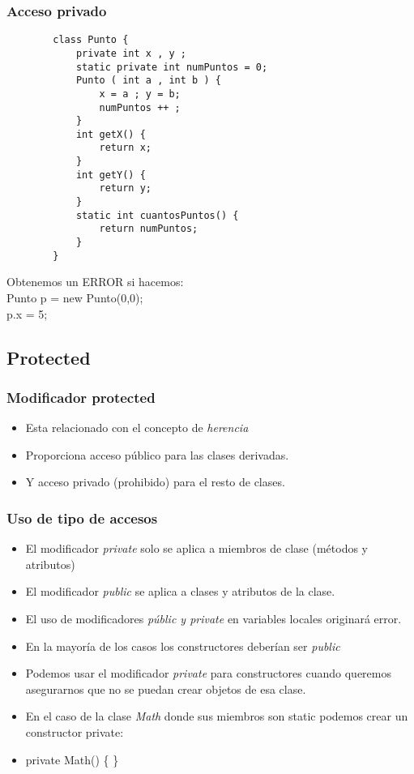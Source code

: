 \documentclass{beamer}
\begin{document}
\begin{frame}[fragile]
\frametitle{Acceso privado}
\begin{footnotesize}
\begin{verbatim}
        class Punto {
            private int x , y ;
            static private int numPuntos = 0;
            Punto ( int a , int b ) {
                x = a ; y = b;
                numPuntos ++ ;
            }
            int getX() {
                return x;
            }
            int getY() {
                return y;
            }
            static int cuantosPuntos() {
                return numPuntos;
            }
        }
\end{verbatim}  
\pause
\begin{center}
\alert{Obtenemos un ERROR si hacemos: \\
\pause
Punto p = new Punto(0,0);\\
p.x = 5;}
\end{center}
\end{footnotesize}
\end{frame}


\subsection{Protected}
\begin{frame}
\frametitle{Modificador protected}
\begin{itemize}[<+->]
\item Esta relacionado con el concepto de \emph{herencia}
\item Proporciona acceso público para las clases derivadas.
\item Y acceso privado (prohibido) para el resto de clases.
\end{itemize}
\pause
\end{frame}

\begin{frame}
\frametitle{Uso de tipo de accesos}
\begin{itemize}[<+->]
\item El modificador \emph{private} solo se aplica a miembros de clase (métodos y atributos) 
\item El modificador \emph{public} se aplica a clases y atributos de la clase.
\item El uso de modificadores \emph{públic y private} en variables locales originará error.
\item En la mayoría de los casos los constructores deberían ser \emph{public}
\item Podemos usar el modificador \emph{private} para constructores cuando queremos asegurarnos que no se puedan crear objetos de esa clase.
\item En el caso de la clase \emph{Math} donde sus miembros son \alert{static} podemos crear un constructor private:
\item private Math() \{ \}
\end{itemize}
\pause
\end{frame}
\end{document}
